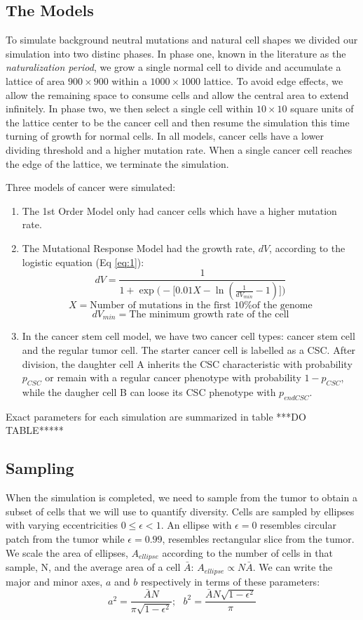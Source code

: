 \documentclass[12pt]{article}
\begin{document}
\subsection{The Models}
To simulate background neutral mutations and natural cell shapes we divided our simulation into two distinc phases. In phase one, known in the literature as the \emph{naturalization period}, we grow a single normal cell to divide and accumulate a lattice of area $900\times900$ within a $1000\times1000$ lattice. To avoid edge effects, we allow the remaining space to consume cells and allow the central area to extend infinitely. In phase two, we then select a single cell within $10\times10$ square units of the lattice center to be the cancer cell and then resume the simulation this time turning of growth for normal cells. In all models, cancer cells have a lower dividing threshold and a higher mutation rate. When a single cancer cell reaches the edge of the lattice, we terminate the simulation.

Three models of cancer were simulated: 
\begin{enumerate}
	\item The 1st Order Model only had cancer cells which have a higher mutation rate. 
	\item The Mutational Response Model had the growth rate, $dV$, according to the logistic equation (Eq \ref{eq:1}):
	\begin{equation} \label{eq:1}
	dV = \frac{1}{1+\exp\big(-\big[0.01X-\ln(\frac{1}{dV_{min}}-1)\big]\big)}
	\end{equation}
	\[
	X = \text{Number of mutations in the first 10\% of the genome}
	\]\[
	dV_{min} = \text{The minimum growth rate of the cell}
	\]
	\item In the cancer stem cell model, we have two cancer cell types: cancer stem cell and the regular tumor cell. The starter cancer cell is labelled as a CSC. After division, the daughter cell A inherits the CSC characteristic with probability $p_{CSC}$ or remain with a regular cancer phenotype with probability $1-p_{CSC}$, while the daugher cell B can loose its CSC phenotype with $p_{endCSC}$. 
\end{enumerate}

Exact parameters for each simulation are summarized in table ***DO TABLE*****

\subsection{Sampling}
When the simulation is completed, we need to sample from the tumor to obtain a subset of cells that we will use to quantify diversity. Cells are sampled by ellipses with varying eccentricities $0 \leq \epsilon < 1$. An ellipse with $\epsilon=0$ resembles circular patch from the tumor while $\epsilon = 0.99$, resembles rectangular slice from the tumor. We scale the area of ellipses, $A_{ellipse}$ according to the number of cells in that sample, N, and the average area of a cell $\bar{A}$: $A_{ellipse} \propto N\bar{A}$. We can write the major and minor axes, $a$ and $b$ respectively in terms of these parameters:
\[ a^2 = \frac{\bar{A}N}{\pi\sqrt{1-\epsilon^2}};~~~ b^2 = \frac{\bar{A}N\sqrt{1-\epsilon^2}}{\pi}\]
\end{document}
